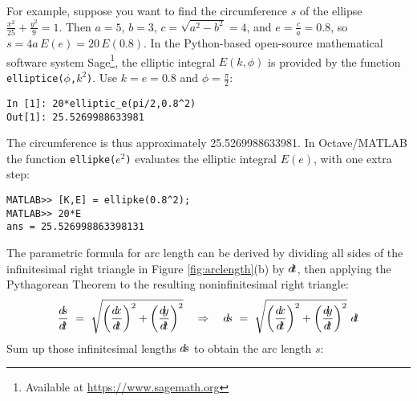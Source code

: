 For example, suppose you want to find the circumference $s$ of the ellipse
$\frac{x^2}{25}+\frac{y^2}{9}=1$. Then $a=5$, $b=3$, $c=\sqrt{a^2-b^2}=4$, and
$e=\frac{c}{a}=0.8$, so $s=4a\,E(e)=20\,E(0.8)$. In the Python-based open-source
mathematical software system Sage\footnote{Available at
\url{https://www.sagemath.org}}, the elliptic integral $E(k,\phi)$ is provided
by the function \texttt{elliptice($\phi$,$k^2$)}. Use $k=e=0.8$ and
$\phi = \frac{\pi}{2}$:
\begin{Verbatim}[frame=single, framesep=2mm]
In [1]: 20*elliptic_e(pi/2,0.8^2)
Out[1]: 25.5269988633981
\end{Verbatim}
The circumference is thus approximately 25.5269988633981. In Octave/MATLAB the
function \texttt{ellipke($e^2$)} evaluates the elliptic integral $E(e)$, with
one extra step:
\begin{Verbatim}[frame=single, framesep=2mm]
MATLAB>> [K,E] = ellipke(0.8^2);
MATLAB>> 20*E
ans = 25.526998863398131
\end{Verbatim}
\newpage
The parametric formula for arc length can be derived by dividing all sides of
the infinitesimal right triangle in Figure \ref{fig:arclength}(b) by $d\!t$, then
applying the Pythagorean Theorem to the resulting noninfinitesimal right
triangle:
\[
\dsdt ~=~ \sqrt{\left(\dxdt\right)^2 + \left(\dydt\right)^2} \quad\Rightarrow\quad
\ds ~=~ \sqrt{\left(\dxdt\right)^2 + \left(\dydt\right)^2}~\dt
\]
Sum up those infinitesimal lengths $d\!s$ to obtain the arc length $s$:


